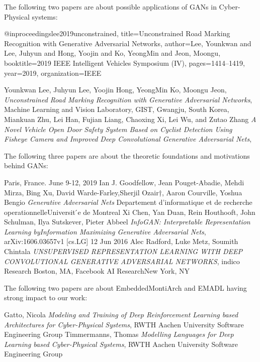 \documentclass[12pt, a4paper]{scrartcl}
\begin{document}
\begin{thebibliography}{9}

\item[] The following two papers are about possible applications of GANs in Cyber-Physical systems:

	@inproceedings{lee2019unconstrained,
	title={Unconstrained Road Marking Recognition with Generative Adversarial Networks},
	author={Lee, Younkwan and Lee, Juhyun and Hong, Yoojin and Ko, YeongMin and Jeon, Moongu},
	booktitle={2019 IEEE Intelligent Vehicles Symposium (IV)},
	pages={1414--1419},
	year={2019},
	organization={IEEE}
	}

	Younkwan Lee, Juhyun Lee, Yoojin Hong, YeongMin Ko, Moongu Jeon,
	\textit{Unconstrained Road Marking Recognition with Generative Adversarial
	Networks},
	Machine Learning and Vision Laboratory, GIST, Gwangju, South Korea,
	Miankuan Zhu, Lei Han, Fujian Liang, Chaoxing Xi, Lei Wu, and Zutao Zhang
	\textit{A Novel Vehicle Open Door Safety System Based on Cyclist Detection
	Using Fisheye Camera and Improved Deep Convolutional
	Generative Adversarial Nets},


	\item[] The following three papers are about the theoretic foundations and motivations behind GANs:

	Paris, France. June 9-12, 2019
	Ian J. Goodfellow,  Jean Pouget-Abadie, Mehdi Mirza, Bing Xu, David Warde-Farley,Sherjil
	Ozair†, Aaron Courville, Yoshua Bengio
	\textit{Generative Adversarial Nets}
	Departement d’informatique et de recherche operationnelleUniversit ́e de Montreal
	Xi Chen, Yan Duan, Rein Houthooft, John Schulman, Ilya Sutskever, Pieter Abbeel
	\textit{InfoGAN: Interpretable Representation Learning byInformation Maximizing Generative
		Adversarial Nets},
	arXiv:1606.03657v1  [cs.LG]  12 Jun 2016
	Alec Radford, Luke Metz, Soumith Chintala
	\textit{UNSUPERVISED REPRESENTATION LEARNING WITH DEEP CONVOLUTIONAL GENERATIVE ADVERSARIAL NETWORKS},
	indico Research Boston, MA, Facebook AI ResearchNew York, NY

\item[] The following two papers are about EmbeddedMontiArch and EMADL having strong impact to our
	work:

	Gatto, Nicola
	\textit{Modeling and Training of Deep Reinforcement Learning
	based Architectures for Cyber-Physical Systems},
	RWTH Aachen University Software Engineering Group
	Timmermanns, Thomas
	\textit{Modelling Languages for Deep Learning based
		Cyber-Physical Systems},
	RWTH Aachen University Software Engineering Group
\end{thebibliography}
\end{document}
